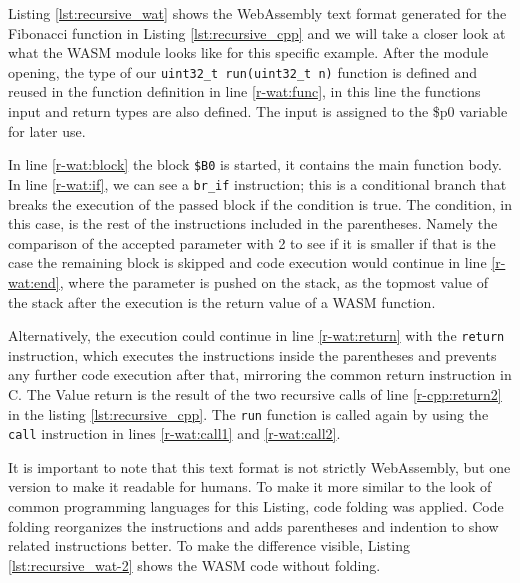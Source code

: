 



Listing \ref{lst:recursive_wat} shows the WebAssembly text format generated for the Fibonacci function in Listing \ref{lst:recursive_cpp} and we will take a closer look at what the WASM module looks like for this specific example. After the module opening, the type of our \lstinline{uint32_t run(uint32_t n)} function is defined and reused in the function definition in line \ref{r-wat:func}, in this line the functions input and return types are also defined. The input is assigned to the \$p0 variable for later use.

In line \ref{r-wat:block} the block \lstinline{$B0} is started, it contains the main function body. In line \ref{r-wat:if}, we can see a \lstinline{br_if} instruction; this is a conditional branch that breaks the execution of the passed block if the condition is true. The condition, in this case, is the rest of the instructions included in the parentheses. Namely the comparison of the accepted parameter with 2 to see if it is smaller if that is the case the remaining block is skipped and code execution would continue in line \ref{r-wat:end}, where the parameter is pushed on the stack, as the topmost value of the stack after the execution is the return value of a WASM function.

Alternatively, the execution could continue in line \ref{r-wat:return} with the \lstinline{return} instruction, which executes the instructions inside the parentheses and prevents any further code execution after that, mirroring the common return instruction in C. The Value return is the result of the two recursive calls of line \ref{r-cpp:return2} in the listing \ref{lst:recursive_cpp}. The \lstinline{run} function is called again by using the \lstinline{call} instruction in lines \ref{r-wat:call1} and \ref{r-wat:call2}.

It is important to note that this text format is not strictly WebAssembly, but one version to make it readable for humans. To make it more similar to the look of common programming languages for this Listing, code folding was applied. Code folding reorganizes the instructions and adds parentheses and indention to show related instructions better. To make the difference visible, Listing \ref{lst:recursive_wat-2} shows the WASM code without folding.

